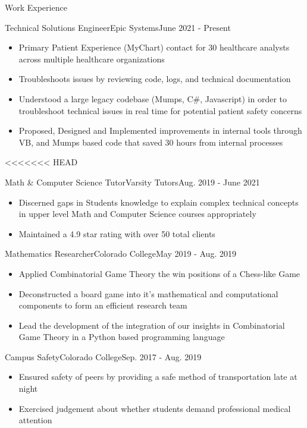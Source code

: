 \begin{cvsection}{Work Experience}
	\begin{cvsubsection}{Technical Solutions Engineer}{Epic Systems}{June 2021 - Present}			
		\begin{itemize}
			\item Primary Patient Experience (MyChart) contact for 30 healthcare analysts across multiple healthcare organizations
			\item Troubleshoots issues by reviewing code, logs, and technical documentation
			\item Understood a large legacy codebase (Mumps, C\#, Javascript) in order to troubleshoot technical issues in real time for potential patient safety concerns
			\item Proposed, Designed and Implemented improvements in internal tools through VB, and Mumps based code that saved 30 hours from internal processes
		\end{itemize}
	\end{cvsubsection}
	
<<<<<<< HEAD
	\begin{cvsubsection}{Math \& Computer Science Tutor}{Varsity Tutors}{Aug. 2019 - June 2021}	
		\begin{itemize}
			\item Discerned gaps in Students knowledge to explain complex technical concepts in upper level Math and Computer Science courses appropriately
			\item Maintained a 4.9 star rating with over 50 total clients
		\end{itemize}
	\end{cvsubsection}
	
	\begin{cvsubsection}{Mathematics Researcher}{Colorado College}{May 2019 - Aug. 2019}
	\begin{itemize}
		\item Applied Combinatorial Game Theory the win positions of a Chess-like Game
		\item Deconstructed a board game into it’s mathematical and computational components to form an efficient research team
		\item Lead the development of the integration of our insights in Combinatorial Game Theory in a Python based programming language
		\end{itemize}
	\end{cvsubsection}
	
		\begin{cvsubsection}{Campus Safety}{Colorado College}{Sep. 2017 - Aug. 2019}
	\begin{itemize}
		\item Ensured safety of peers by providing a safe method of transportation late at night
		\item Exercised judgement about whether students demand professional medical attention
		\end{itemize}
	\end{cvsubsection}
	


\end{cvsection}
